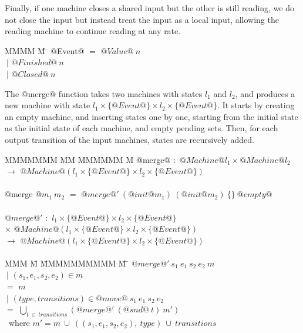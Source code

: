 Finally, if one machine closes a shared input but the other is still reading, we do not close the input but instead treat the input as a local input, allowing the reading machine to continue reading at any rate. 

\begin{tabbing}
MMMM \= M \= \kill
@Event@ \> $=$  \> $@Value@~n$ \\
       \> $~|$ \> $@Finished@~n$ \\
       \> $~|$ \> $@Closed@~n$ \\
\end{tabbing}

The @merge@ function takes two machines with states $l_1$ and $l_2$, and produces a new machine with state $l_1 \times \{@Event@\} \times l_2 \times \{@Event@\}$.
It starts by creating an empty machine, and inserting states one by one, starting from the initial state as the initial state of each machine, and empty pending sets.
Then, for each output transition of the input machines, states are recursively added.

\begin{tabbing}
MMMMMMM \= MM \= MMMMMM \= M\kill
@merge@ \> $:$ \> $@Machine @l_1 \times @Machine @l_2$ \\
        \> $\to$ \> $@Machine @(l_1 \times \{@Event@\} \times l_2 \times \{@Event@\})$ \\
\\
@merge @$m_1~m_2$ \> $=$ \> $@merge@'~(@init @m_1)~(@init @m_2)~\{\}~@empty@$ \\
\\
$@merge@'$ \> $:$ \> $l_1 \times \{@Event@\} \times l_2 \times \{@Event@\}$               \\
           \> $\times$ \> $@Machine @(l_1 \times \{@Event@\} \times l_2 \times \{@Event@\})$ \\
           \> $\to$ \> $@Machine @(l_1 \times \{@Event@\} \times l_2 \times \{@Event@\})$ \\
\\
MMM \= M \= MMMMMMMMMM \= M \=\kill
$@merge@'~s_1~e_1~s_2~e_2~m$ \\
 \> $~|$ \> $(s_1, e_1, s_2, e_2) \in m$  \\
 \> $=$  \> $m$ \\
 \> $~|$ \> $(\mathit{type},\mathit{transitions}) \in @move@~s_1~e_1~s_2~e_2$ \\
 \> $=$  \> $\bigcup_{t~\in~\mathit{transitions}}(@merge@'~(@snd@~t)~m')$\\
~where  \> $m' = m~\cup~((s_1,e_1,s_2,e_2),~\mathit{type})~\cup~\mathit{transitions}$ \\
\end{tabbing}

